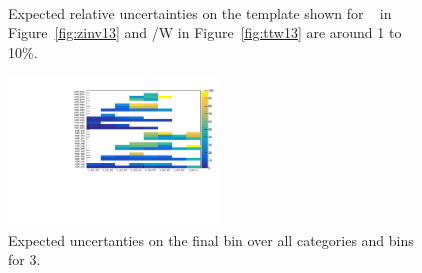 \begin{figure}[h!]
  \centering
  ~~
  \\
  \caption{\label{fig:expected13} Expected relative uncertainties on the template shown for \zInv~ in Figure~\ref{fig:zinv13} 
  and \ttbar/W in Figure~\ref{fig:ttw13} are around 1 to 10\%.}
  
\end{figure}
\begin{figure}[]
  \centering
  \includegraphics[width=0.5\textwidth]{figures/template/frenchFlagLastBin.pdf}
  \caption{\label{fig:frenchFlagLastBin} Expected uncertanties on the final bin
over all categories and \scalht bins for 3\ifb.}
\end{figure}

